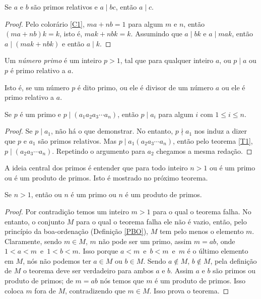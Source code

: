 \begin{theorem}\label{T1}
    Se $a$ e $b$ são primos relativos e $a\mid bc$, então $a\mid c$.
    \begin{proof}
        Pelo colorário \ref{C1}, $ma + nb = 1$ para algum $m$ e $n$, então $(ma +nb)k = k$, isto é, $mak + nbk = k$. Assumindo que $a\mid bk$ e $a\mid mak$, então $a\mid (mak + nbk)$ e então $a\mid k$.
    \end{proof}
\end{theorem}
\begin{definition}
    Um \textit{número primo} é um inteiro $p>1$, tal que para qualquer inteiro $a$, ou $p\mid a$ ou $p$ é primo relativo a $a$.
\end{definition}
Isto é, se um número $p$ é dito primo, ou ele é divisor de um número $a$ ou ele é primo relativo a $a$.
\begin{theorem}\label{T2}
    Se $p$ é um primo e $p\mid (a_{1}a_{2}a_{3}\cdots a_{n})$, então $p\mid a_{i}$ para algum $i$ com $1\leq i \leq n$.
    \begin{proof}
        Se $p\mid a_{1}$, não há o que demonstrar. No entanto, $p\nmid a_{1}$ nos induz a dizer que $p$ e $a_{1}$ são primos relativos. Mas $p\mid a_{1}(a_{2}a_{3}\cdots a_{n})$, então pelo teorema \ref{T1}, $p\mid (a_{2}a_{3}\cdots a_{n})$. Repetindo o argumento para $a_{2}$ chegamos a mesma redação.
    \end{proof}
\end{theorem}
A ideia central dos primos é entender que para todo inteiro $n>1$ ou é um primo ou é um produto de primos. Isto é mostrado no próximo teorema.
\begin{theorem}\label{Prime}
    Se $n>1$, então ou $n$ é um primo ou $n$ é um produto de primos.
    \begin{proof}
        Por contradição temos um inteiro $m>1$ para o qual o teorema falha. No entanto, o conjunto $M$ para o qual o teorema falha ele não é vazio, então, pelo princípio da boa-ordenação (Definição \ref{PBO}), $M$ tem pelo menos o elemento $m$. Claramente, sendo $m \in M$, $m$ não pode ser um primo, assim $m=ab$, onde $1<a<m$\ e\ $1<b<m$. Isso porque $a<m$\ e\ $b<m$\ e\ $m$ é o último elemento em $M$, nós não podemos ter $a \in M$ ou $b \in M$. Sendo $a \notin M$, $b \notin M$, pela definição de $M$ o teorema deve ser verdadeiro para ambos $a$ e $b$. Assim $a$ e $b$ são primos ou produto de primos; de $m=ab$ nós temos que $m$ é um produto de primos. Isso coloca $m$ fora de $M$, contradizendo que $m \in M$. Isso prova o teorema.
    \end{proof}
\end{theorem}
